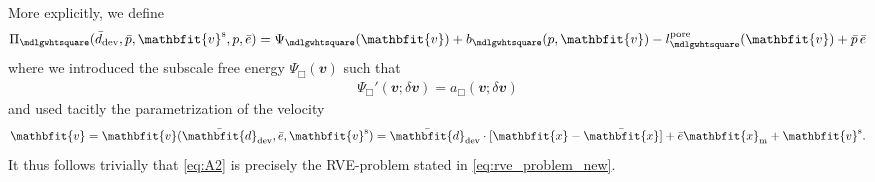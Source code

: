 \documentclass[12pt,review]{elsarticle}
\renewcommand{\ta}[1]{\mathbfit{#1}}
\renewcommand{\ts}[1]{\mathbfit{#1}}
\renewcommand{\Box}{\mdlgwhtsquare}
\newcommand{\pore}{\mathrm{pore}}
\begin{document}
More explicitly, we define
\begin{align}
 \label{eq:A3}\Pi_\Box(\bar{d}_\dev,\bar p, \ta v^\fluct,p,\bar{e}) = \Psi_\Box(\ta v) + b_\Box(p,\ta v) - l_\Box^\pore(\ta v) + \bar{p}\,\bar{e}
\end{align}
where we introduced the subscale free energy $\Psi_\Box(\ta v)$ such that
\begin{align}
 \label{eq:A4}\Psi_\Box'(\ta v;\delta\ta v) = a_\Box(\ta v;\delta\ta v)
\end{align}
and used tacitly the parametrization of the velocity
\begin{align}
 \ta v=\ta v(\bar{\ts d}_\dev,\bar{e},\ta v^\fluct) = \bar{\ts d}_\dev\cdot[\ta x-\bar{\ta x}] + \bar{e} \ta x_\mean + \ta v^\fluct.
\end{align}
It thus follows trivially that \eqref{eq:A2} is precisely the RVE-problem stated in \eqref{eq:rve_problem_new}.
\end{document}
